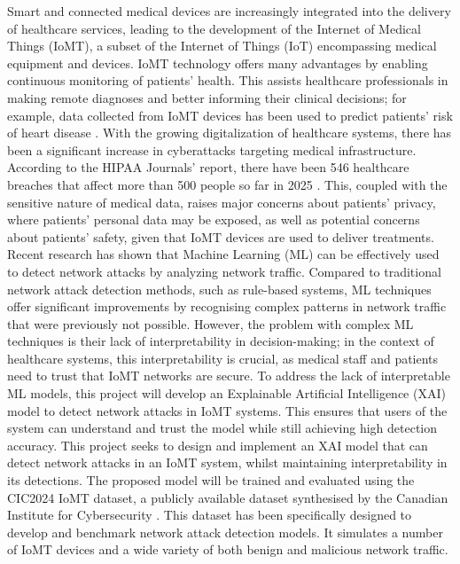 \documentclass[11pt,a4paper]{article}
\begin{document}
Smart and connected medical devices are increasingly integrated into the delivery of healthcare services, leading to the development of the Internet of Medical Things (IoMT), a subset of the Internet of Things (IoT) encompassing medical equipment and devices. IoMT technology offers many advantages by enabling continuous monitoring of patients’ health. This assists healthcare professionals in making remote diagnoses and better informing their clinical decisions; for example, data collected from IoMT devices has been used to predict patients' risk of heart disease \cite{baseer2024healthcare}. With the growing digitalization of healthcare systems, there has been a significant increase in cyberattacks targeting medical infrastructure. According to the HIPAA Journals’ report, there have been 546 healthcare breaches that affect more than 500 people so far in 2025 \cite{hipaajournal}. This, coupled with the sensitive nature of medical data, raises major concerns about patients’ privacy, where patients' personal data may be exposed, as well as potential concerns about patients' safety, given that IoMT devices are used to deliver treatments.
Recent research has shown that Machine Learning (ML) can be effectively used to detect network attacks by analyzing network traffic. Compared to traditional network attack detection methods, such as rule-based systems, ML techniques offer significant improvements by recognising complex patterns in network traffic that were previously not possible. However, the problem with complex ML techniques is their lack of interpretability in decision-making; in the context of healthcare systems, this interpretability is crucial, as medical staff and patients need to trust that IoMT networks are secure. To address the lack of interpretable ML models, this project will develop an Explainable Artificial Intelligence (XAI) model to detect network attacks in IoMT systems. This ensures that users of the system can understand and trust the model while still achieving high detection accuracy. 
This project seeks to design and implement an XAI model that can detect network attacks in an IoMT system, whilst maintaining interpretability in its detections. The proposed model will be trained and evaluated using the CIC2024 IoMT dataset, a publicly available dataset synthesised by the Canadian Institute for Cybersecurity \cite{dadkhah2024ciciomt2024}. This dataset has been specifically designed to develop and benchmark network attack detection models. It simulates a number of IoMT devices and a wide variety of both benign and malicious network traffic.
\end{document}
